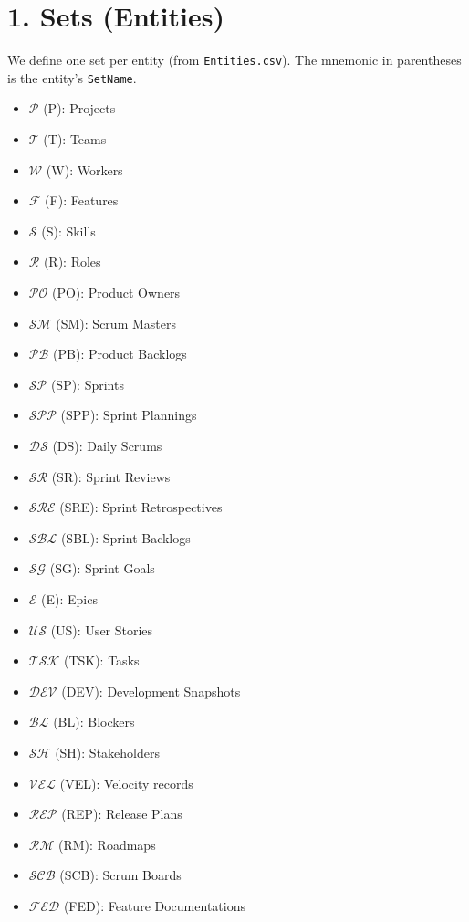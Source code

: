 \documentclass[11pt,a4paper]{article}
\begin{document}
\newpage
\section{1. Sets (Entities)}
We define one set per entity (from \texttt{Entities.csv}). The mnemonic in parentheses is the entity's \texttt{SetName}.
\begin{itemize}[leftmargin=2em]
  \item \(\mathcal{P}\) (P): Projects
  \item \(\mathcal{T}\) (T): Teams
  \item \(\mathcal{W}\) (W): Workers
  \item \(\mathcal{F}\) (F): Features
  \item \(\mathcal{S}\) (S): Skills
  \item \(\mathcal{R}\) (R): Roles
  \item \(\mathcal{PO}\) (PO): Product Owners
  \item \(\mathcal{SM}\) (SM): Scrum Masters
  \item \(\mathcal{PB}\) (PB): Product Backlogs
  \item \(\mathcal{SP}\) (SP): Sprints
  \item \(\mathcal{SPP}\) (SPP): Sprint Plannings
  \item \(\mathcal{DS}\) (DS): Daily Scrums
  \item \(\mathcal{SR}\) (SR): Sprint Reviews
  \item \(\mathcal{SRE}\) (SRE): Sprint Retrospectives
  \item \(\mathcal{SBL}\) (SBL): Sprint Backlogs
  \item \(\mathcal{SG}\) (SG): Sprint Goals
  \item \(\mathcal{E}\) (E): Epics
  \item \(\mathcal{US}\) (US): User Stories
  \item \(\mathcal{TSK}\) (TSK): Tasks
  \item \(\mathcal{DEV}\) (DEV): Development Snapshots
  \item \(\mathcal{BL}\) (BL): Blockers
  \item \(\mathcal{SH}\) (SH): Stakeholders
  \item \(\mathcal{VEL}\) (VEL): Velocity records
  \item \(\mathcal{REP}\) (REP): Release Plans
  \item \(\mathcal{RM}\) (RM): Roadmaps
  \item \(\mathcal{SCB}\) (SCB): Scrum Boards
  \item \(\mathcal{FED}\) (FED): Feature Documentations
\end{itemize}
\end{document}
